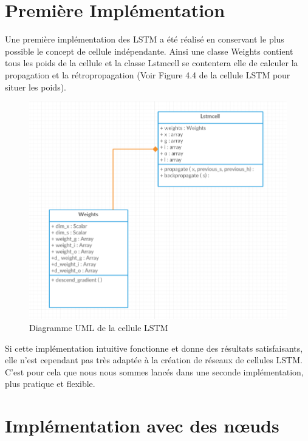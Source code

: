 \section{Première Implémentation}

Une première implémentation des LSTM a été réalisé en conservant le plus possible le concept de cellule indépendante. Ainsi une classe Weights contient tous les poids de la cellule et la classe Lstmcell se contentera elle de calculer la propagation et la rétropropagation (Voir Figure 4.4 de la cellule LSTM pour situer les poids).

\begin{figure}[h!]
\begin{center}
\includegraphics[scale=0.8]{images/chapter6/UML_LSTM_Implementation_1.png}
\caption{Diagramme UML de la cellule LSTM}
\label{cellule LSTM UML 1}
\end{center}
\end{figure}

Si cette implémentation intuitive fonctionne et donne des résultats satisfaisants, elle n'est cependant pas très adaptée à la création de réseaux de cellules LSTM. C'est pour cela que nous nous sommes lancés dans une seconde implémentation, plus pratique et flexible.



\section{Implémentation avec des nœuds}

